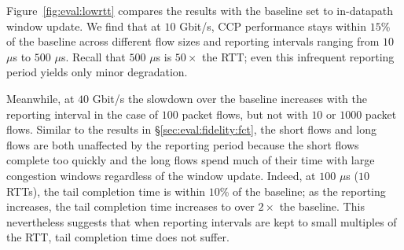 Figure~\ref{fig:eval:lowrtt} compares the results with the baseline set to in-datapath window update. 
We find that at $10$ Gbit/s, CCP performance stays within $15$\% of the baseline across different flow sizes and reporting intervals ranging from $10$ $\mu$s to $500$ $\mu$s. 
Recall that $500$ $\mu$s is $50\times$ the RTT; even this infrequent reporting period yields only minor degradation.

Meanwhile, at $40$ Gbit/s the slowdown over the baseline increases with the reporting interval in the case of $100$ packet flows, but not with $10$ or $1000$ packet flows. 
Similar to the results in \S\ref{sec:eval:fidelity:fct}, the short flows and long flows are both unaffected by the reporting period because the short flows complete too quickly and the long flows spend much of their time with large congestion windows regardless of the window update.
Indeed, at $100$ $\mu$s ($10$ RTTs), the tail completion time is within $10$\% of the baseline; as the reporting increases, the tail completion time increases to over $2\times$ the baseline. 
This nevertheless suggests that when reporting intervals are kept to small multiples of the RTT, tail completion time does not suffer.
